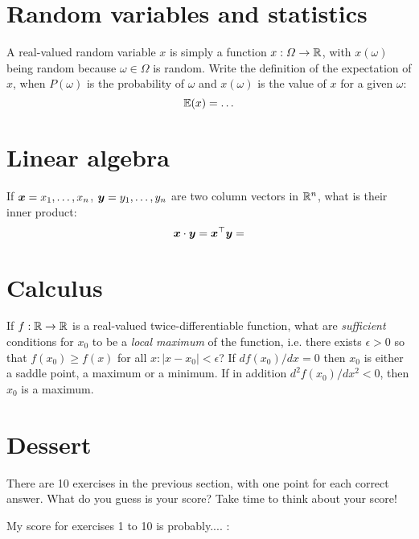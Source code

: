 \documentclass[a4paper]{article}
\begin{document}
\section{Random variables and statistics}


\begin{exercise}
  A real-valued random variable $x$ is simply a function
  $x : \Omega \to {\mathbb{R}}$, with $x(\omega)$ being random because
  $\omega \in \Omega$ is random.  Write the definition of the
  expectation of $x$, when $P(\omega)$ is the probability of $\omega$ and
  $x(\omega)$ is the value of $x$ for a given $\omega$:
  \[
  \E(x) = 
  \ifdefined \solution
  \sum_{\omega \in \Omega} x(\omega) P(\omega) 
  \else
  \ldots
  \fi
  \]
\end{exercise}



\section{Linear algebra}

\begin{exercise}
  If $\bx = x_1, \ldots, x_n$, $\by = y_1, \ldots, y_n$ are two column vectors in ${\mathbb{R}}^n$, what is their inner product:
  \[
  \bx \cdot \by = \bx^\top \by = 
  \ifdefined \solution
  \sum_{i=1}^n x_i y_i
  \fi
  \]
\end{exercise}


\section{Calculus}

\begin{exercise}
  If $f : {\mathbb{R}} \to {\mathbb{R}}$ is a real-valued twice-differentiable function, what are \emph{sufficient} conditions for $x_0$ to be a \emph{local maximum} of the function, i.e. there exists $\epsilon > 0$ so that $f(x_0) \geq f(x)$ for all $x : |x - x_0| < \epsilon$?
\ifdefined\solution
If $d f(x_0) /dx  = 0$ then
$x_0$ is either a saddle point, a maximum or a minimum. If in addition $d^2 f(x_0) /dx^2 < 0$, then $x_0$ is a maximum.
\fi
\end{exercise}

\section{Dessert}
\begin{exercise}
  There are 10 exercises in the previous section, with one point for each correct answer. What do you guess is your score? Take time to think about your score!

  My score for exercises 1 to 10 is probably.... : 
\end{exercise}
\end{document}
